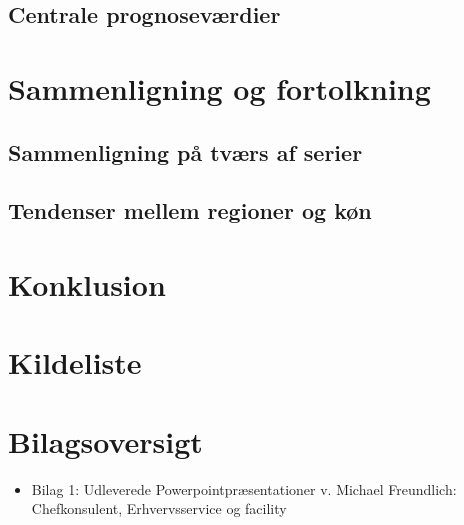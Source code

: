 \documentclass[
]{article}
\providecommand{\tightlist}{%
  \setlength{\itemsep}{0pt}\setlength{\parskip}{0pt}}\usepackage{longtable,booktabs,array}
\begin{document}
\subsection{Centrale prognoseværdier}\label{centrale-prognosevuxe6rdier}

\section{Sammenligning og
fortolkning}\label{sammenligning-og-fortolkning}

\subsection{Sammenligning på tværs af
serier}\label{sammenligning-puxe5-tvuxe6rs-af-serier}

\subsection{Tendenser mellem regioner og
køn}\label{tendenser-mellem-regioner-og-kuxf8n}

\section{Konklusion}\label{konklusion}

\newpage

\section{Kildeliste}\label{kildeliste}

\newpage

\section{Bilagsoversigt}\label{bilagsoversigt}

\begin{itemize}
\tightlist
\item
  Bilag 1: Udleverede Powerpointpræsentationer v. Michael Freundlich:
  Chefkonsulent, Erhvervsservice og facility
\end{itemize}
\end{document}
